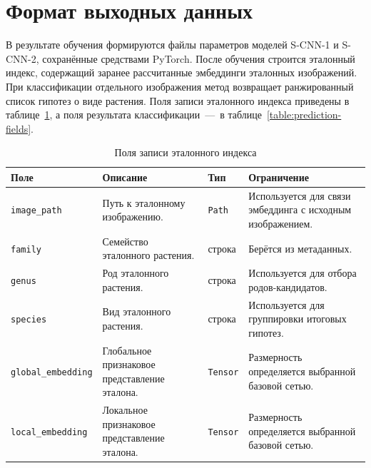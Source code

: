 \section{Формат выходных данных}
В результате обучения формируются файлы параметров моделей S-CNN-1 и S-CNN-2, сохранённые средствами PyTorch. После обучения строится эталонный индекс, содержащий заранее рассчитанные эмбеддинги эталонных изображений. При классификации отдельного изображения метод возвращает ранжированный список гипотез о виде растения. Поля записи эталонного индекса приведены в таблице~\ref{table:reference-embedding-fields}, а поля результата классификации~---~в таблице~\ref{table:prediction-fields}.

\begin{table}[!htbp]
	\centering
	\caption{Поля записи эталонного индекса}
	\label{table:reference-embedding-fields}
	\footnotesize
	\renewcommand{\arraystretch}{1.2}
	\begin{tabularx}{\linewidth}{|p{3.8cm}|X|p{2.6cm}|p{3.6cm}|}
		\hline
		\textbf{Поле} & \textbf{Описание} & \textbf{Тип} & \textbf{Ограничение} \\
		\hline
		\texttt{image\_path} & Путь к эталонному изображению. & \texttt{Path} & Используется для связи эмбеддинга с исходным изображением. \\
		\hline
		\texttt{family} & Семейство эталонного растения. & строка & Берётся из метаданных. \\
		\hline
		\texttt{genus} & Род эталонного растения. & строка & Используется для отбора родов-кандидатов. \\
		\hline
		\texttt{species} & Вид эталонного растения. & строка & Используется для группировки итоговых гипотез. \\
		\hline
		\texttt{global\_embedding} & Глобальное признаковое представление эталона. & \texttt{Tensor} & Размерность определяется выбранной базовой сетью. \\
		\hline
		\texttt{local\_embedding} & Локальное признаковое представление эталона. & \texttt{Tensor} & Размерность определяется выбранной базовой сетью. \\
		\hline
	\end{tabularx}
\end{table}
\FloatBarrier

